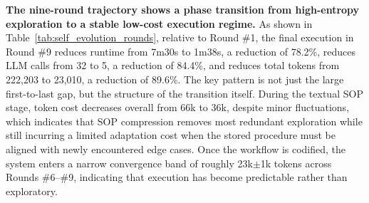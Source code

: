 \begin{table}[t]
\centering
\caption{\textbf{Nine-round evolution trajectory on the LangChain GitHub research task.} The experiment starts from scratch in Round \#1, iteratively refines a textual SOP in Rounds \#2--\#5, and enters the codified execution regime in Rounds \#6--\#9.}
\def\arraystretch{0.99}
\setlength{\tabcolsep}{0.42em}
\label{tab:self_evolution_rounds}
\end{table}

\textbf{The nine-round trajectory shows a phase transition from high-entropy exploration to a stable low-cost execution regime.} 
As shown in Table~\ref{tab:self_evolution_rounds}, relative to Round \#1, the final execution in Round \#9 reduces runtime from 7m30s to 1m38s, a reduction of 78.2\%, reduces LLM calls from 32 to 5, a reduction of 84.4\%, and reduces total tokens from 222,203 to 23,010, a reduction of 89.6\%. 
The key pattern is not just the large first-to-last gap, but the structure of the transition itself. 
During the textual SOP stage, token cost decreases overall from 66k to 36k, despite minor fluctuations, which indicates that SOP compression removes most redundant exploration while still incurring a limited adaptation cost when the stored procedure must be aligned with newly encountered edge cases.
Once the workflow is codified, the system enters a narrow convergence band of roughly 23k$\pm$1k tokens across Rounds \#6--\#9, indicating that execution has become predictable rather than exploratory.

